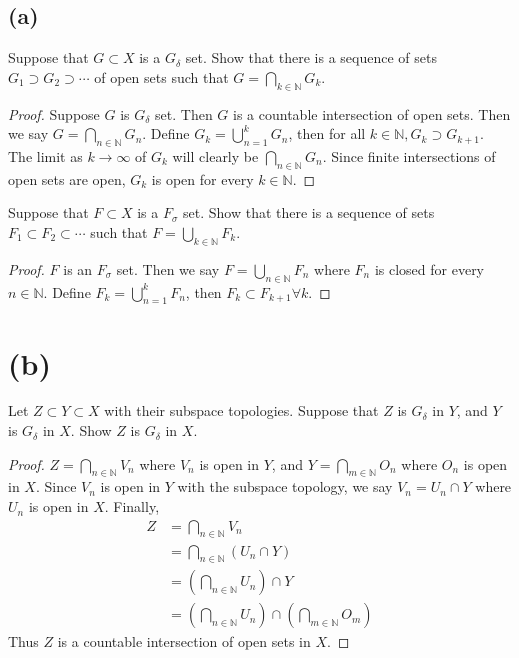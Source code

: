 \documentclass{article}
\theoremstyle{definition}
\begin{document}
\subsection*{(a)}
\begin{mdframed}
    Suppose that $G \subset X$ is a $G_\delta$ set. Show that there is a sequence of sets $G_1 \supset G_2 \supset \cdots$
of open sets such that $G = \bigcap_{k \in \mathbb{N}}G_k$.
\end{mdframed}
\begin{proof}
    Suppose $G$ is $G_\delta$ set. Then $G$ is a countable intersection of open sets.
    Then we say $G = \bigcap_{n \in \mathbb{N}}G_n$. Define $G_k = \bigcup_{n=1}^k G_n$, then 
    for all $k \in \mathbb{N}, G_k \supset G_{k+1}$. The limit as $k \rightarrow \infty$ of $G_k$ will
    clearly be $\bigcap_{n \in \mathbb{N}} G_n$. Since finite intersections of open sets are open,
    $G_k$ is open for every $k \in \mathbb{N}$.
\end{proof}
\begin{mdframed}
    Suppose that $F \subset X$ is a $F_\sigma$ set. Show that there is a sequence of sets $F_1 \subset F_2 \subset \cdots$ 
    such that $F = \bigcup_{k \in \mathbb{N}} F_k$.
\end{mdframed}
\begin{proof}
    $F$ is an $F_\sigma$ set. Then we say $F = \bigcup_{n \in \mathbb{N}} F_n$ where $F_n$ is closed for every $n \in \mathbb{N}$.
    Define $F_k = \bigcup_{n = 1}^k F_n$, then $F_k \subset F_{k+1} \forall k$.
\end{proof}
\section*{(b)}
\begin{mdframed}
    Let $Z \subset Y \subset X$ with their subspace topologies. Suppose that $Z$ is $G_\delta$ in $Y$, and $Y$ is $G_\delta$ in $X$.
    Show $Z$ is $G_\delta$ in $X$.
\end{mdframed}
\begin{proof}
    $Z = \bigcap_{n \in \mathbb{N}}V_n$ where $V_n$ is open in $Y$, and $Y = \bigcap_{m \in \mathbb{N}}O_n$ where $O_n$ is open in $X$.
    Since $V_n$ is open in $Y$ with the subspace topology, we say $V_n = U_n \cap Y$ where $U_n$ is open in $X$. Finally,
    \begin{align*}
        Z &= \bigcap_{n \in \mathbb{N}}V_n \\
        &= \bigcap_{n \in \mathbb{N}}\left(U_n \cap Y\right) \\
        &= \left(\bigcap_{n \in \mathbb{N}}U_n\right) \cap Y \\
        &= \left(\bigcap_{n \in \mathbb{N}}U_n\right) \cap \left(\bigcap_{m \in \mathbb{N}}O_m\right)
    \end{align*}
    Thus $Z$ is a countable intersection of open sets in $X$.
\end{proof}
\end{document}
